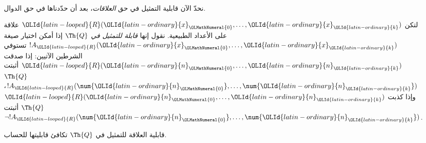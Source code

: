 \documentclass[../../../include/open-logic-section]{subfiles}
\begin{document}


نحدّ الآن قابلية التمثيل في حق \emph{العلاقات}، بعد أن حدّدناها في حق الدوال.

\begin{defn}
 لتكن
${\OLId{latin-looped}{R}}({\OLId{latin-ordinary}{x}}_{\OLMathNumeral{0}},\dots,{\OLId{latin-ordinary}{x}}_{\OLId{latin-ordinary}{k}})$ علاقة على الأعداد الطبيعية.
نقول إنها {\em قابلة للتمثيل في $\Th{Q}$} إذا أمكن اختيار صيغة
$!A_{\OLId{latin-looped}{R}}({\OLId{latin-ordinary}{x}}_{\OLMathNumeral{0}},\dots,{\OLId{latin-ordinary}{x}}_{\OLId{latin-ordinary}{k}})$ تستوفي الشرطين الآتيين:
إذا صدقت ${\OLId{latin-looped}{R}}({\OLId{latin-ordinary}{n}}_{\OLMathNumeral{0}},\dots,{\OLId{latin-ordinary}{n}}_{\OLId{latin-ordinary}{k}})$ أثبتت $\Th{Q}$
$!A_{\OLId{latin-looped}{R}}(\num{{\OLId{latin-ordinary}{n}}_{\OLMathNumeral{0}}},\dots,\num{{\OLId{latin-ordinary}{n}}_{\OLId{latin-ordinary}{k}}})$،
وإذا كذبت ${\OLId{latin-looped}{R}}({\OLId{latin-ordinary}{n}}_{\OLMathNumeral{0}},\dots,{\OLId{latin-ordinary}{n}}_{\OLId{latin-ordinary}{k}})$ أثبتت $\Th{Q}$
$\lnot !A_{\OLId{latin-looped}{R}}(\num{{\OLId{latin-ordinary}{n}}_{\OLMathNumeral{0}}},\dots,\num{{\OLId{latin-ordinary}{n}}_{\OLId{latin-ordinary}{k}}})$.
\end{defn}

\begin{thm}
 قابلية العلاقة للتمثيل في
$\Th{Q}$ تكافئ قابليتها للحساب.
\end{thm}
\end{document}
